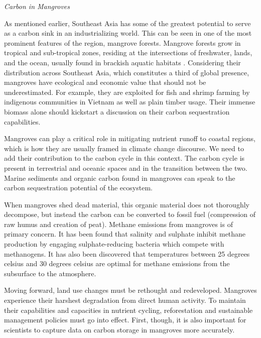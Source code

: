 \textit{Carbon in Mangroves} 

As mentioned earlier, Southeast Asia has some of the greatest potential to serve as a carbon sink in an industrializing world. This can be seen in one of the most prominent features of the region, mangrove forests. Mangrove forests grow in tropical and sub-tropical zones, residing at the intersections of freshwater, lands, and the ocean, usually found in brackish aquatic habitats \citep{bravo2017managing}. Considering their distribution across Southeast Asia, which constitutes a third of global presence,  mangroves have ecological and economic value that should not be underestimated. For example, they are exploited for fish and shrimp farming by indigenous communities in Vietnam as well as plain timber usage. Their immense biomass alone should kickstart a discussion on their carbon sequestration capabilities.

Mangroves can play a critical role in mitigating nutrient runoff to coastal regions, which is how they are usually framed in climate change discourse. We need to add their contribution to the carbon cycle in this context. The carbon cycle is present in terrestrial and oceanic spaces and in the transition between the two. Marine sediments and organic carbon found in mangroves can speak to the carbon sequestration potential of the ecosystem.

When mangroves shed dead material, this organic material does not thoroughly decompose, but instead the carbon can be converted to fossil fuel (compression of raw humus and creation of peat). Methane emissions from mangroves is of primary concern. It has been found that salinity and sulphate inhibit methane production by engaging sulphate-reducing bacteria which compete with methanogens. It has also been discovered that temperatures between 25 degrees celsius and 30 degrees celsius are optimal for methane emissions from the subsurface to the atmosphere. 

Moving forward, land use changes must be rethought and redeveloped. Mangroves experience their harshest degradation from direct human activity. To maintain their capabilities and capacities in nutrient cycling, reforestation and sustainable management policies must go into effect. First, though, it is also important for scientists to capture data on carbon storage in mangroves more accurately.

